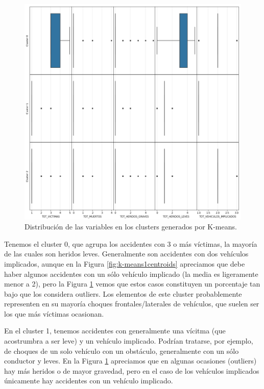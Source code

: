 \documentclass[oneside]{book}
\begin{document}
\begin{figure}[H]
  \centering
  \includegraphics[width=120mm]{figures/accidentes/k-means1distribution}
  \caption{Distribución de las variables en los clusters generados por
    K-means.}
  \label{fig:k-means1distribution}
\end{figure}

Tenemos el cluster 0, que agrupa los accidentes con 3 o más víctimas,
la mayoría de las cuales son heridos leves. Generalmente son
accidentes con dos vehículos implicados, aunque en la Figura
\ref{fig:k-means1centroids} apreciamos que debe haber algunos
accidentes con un sólo vehículo implicado (la media es ligeramente
menor a 2), pero la Figura \ref{fig:k-means1distribution} vemos que
estos casos constituyen un porcentaje tan bajo que los considera
outliers. Los elementos de este cluster probablemente representen en
su mayoría choques frontales/laterales de vehículos, que suelen ser
los que más víctimas ocasionan.

En el cluster 1, tenemos accidentes con generalmente una vícitma (que
acostrumbra a ser leve) y un vehículo implicado. Podrían tratarse, por
ejemplo, de choques de un solo vehículo con un obstáculo, generalmente
con un sólo conductor y leves. En la Figura
\ref{fig:k-means1distribution} apreciamos que en algunas ocasiones
(outliers) hay más heridos o de mayor gravedad, pero en el caso de los
vehículos implicados únicamente hay accidentes con un vehículo
implicado.
\end{document}
